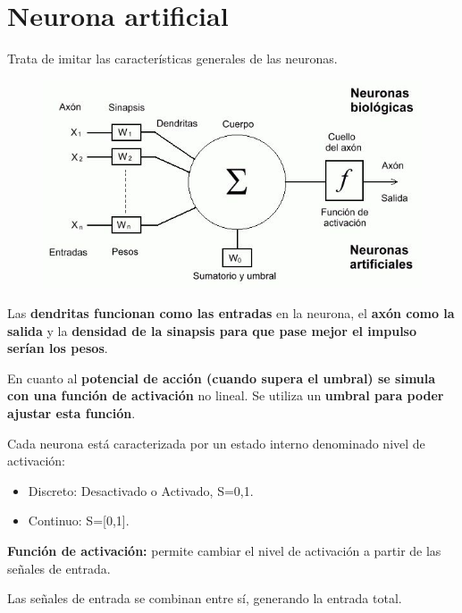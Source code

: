 \documentclass[12pt, twoside, openright]{report} %
\begin{document}
\section{Neurona artificial}
Trata de imitar las características generales de las neuronas.
\begin{figure}[H]
	{\includegraphics[scale=.8]{neurona-vs-perceptron.jpg}}
\end{figure}

Las \textbf{dendritas funcionan como las entradas} en la neurona, el \textbf{axón como la salida} y la \textbf{densidad de la sinapsis para que pase mejor el impulso serían los pesos}.

En cuanto al \textbf{potencial de acción (cuando supera el umbral) se simula con una función de activación} no lineal. Se utiliza un \textbf{umbral para poder ajustar esta función}.

Cada neurona está caracterizada por un estado interno denominado nivel de activación:
\begin{itemize}
	\item Discreto: Desactivado o Activado, S=0,1.
	\item Continuo: S=[0,1].
\end{itemize}

\textbf{Función de activación:} permite cambiar el nivel de activación a partir de las señales de entrada.

Las señales de entrada se combinan entre sí, generando la entrada total.
\end{document}
